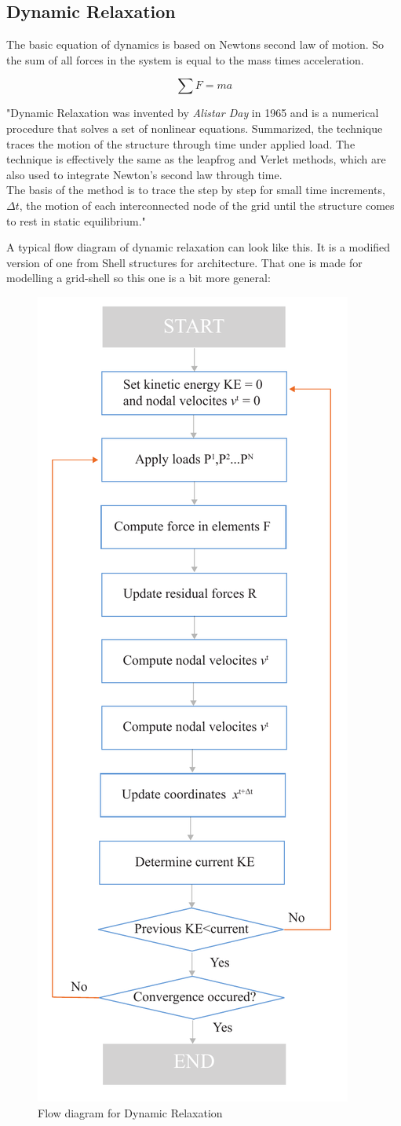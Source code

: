\subsection{Dynamic Relaxation}\label{DR}

The basic equation of dynamics is based on Newtons second law of motion. So the sum of all forces in the system is equal to the mass times acceleration.

\begin{equation}
\sum F = ma
\end{equation}

"Dynamic Relaxation was invented by \textit{ Alistar Day} in 1965 and is a numerical procedure that solves a set of nonlinear equations. Summarized, the technique traces the motion of the structure through time under applied load. The technique is effectively the same as the leapfrog and Verlet methods, which are also used to integrate Newton's second law through time.\\
The basis of the method is to trace the step by step for small time increments, $\Delta t$, the motion of each interconnected node of the grid until the structure comes to rest in static equilibrium."

A typical flow diagram of dynamic relaxation can look like this. It is a modified version of one from Shell structures for architecture. That one is made for modelling a grid-shell so this one is a bit more general:

\begin{figure}[H]
\centering
\includegraphics[height=1.2\linewidth ]{figure/Theory/DRScheme.pdf}
\caption{Flow diagram for Dynamic Relaxation }
\end{figure}


